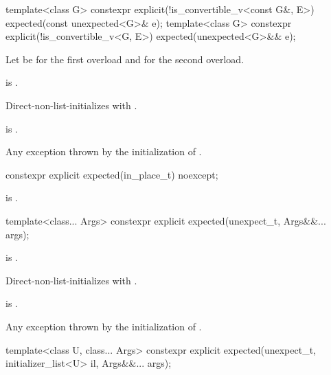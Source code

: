 %
\begin{itemdecl}
template<class G>
  constexpr explicit(!is_convertible_v<const G&, E>) expected(const unexpected<G>& e);
template<class G>
  constexpr explicit(!is_convertible_v<G, E>) expected(unexpected<G>&& e);
\end{itemdecl}

\begin{itemdescr}
\pnum
Let  be  for the first overload and
 for the second overload.

\pnum
\constraints
{} is .

\pnum
\effects
Direct-non-list-initializes 
with .

\pnum
\ensures
{} is .

\pnum
\throws
Any exception thrown by the initialization of .
\end{itemdescr}

%
\begin{itemdecl}
constexpr explicit expected(in_place_t) noexcept;
\end{itemdecl}

\begin{itemdescr}
\pnum
\ensures
{} is .
\end{itemdescr}

%
\begin{itemdecl}
template<class... Args>
  constexpr explicit expected(unexpect_t, Args&&... args);
\end{itemdecl}

\begin{itemdescr}
\pnum
\constraints
{} is .

\pnum
\effects
Direct-non-list-initializes 
with .

\pnum
\ensures
{} is .

\pnum
\throws
Any exception thrown by the initialization of .
\end{itemdescr}

%
\begin{itemdecl}
template<class U, class... Args>
    constexpr explicit expected(unexpect_t, initializer_list<U> il, Args&&... args);
\end{itemdecl}

